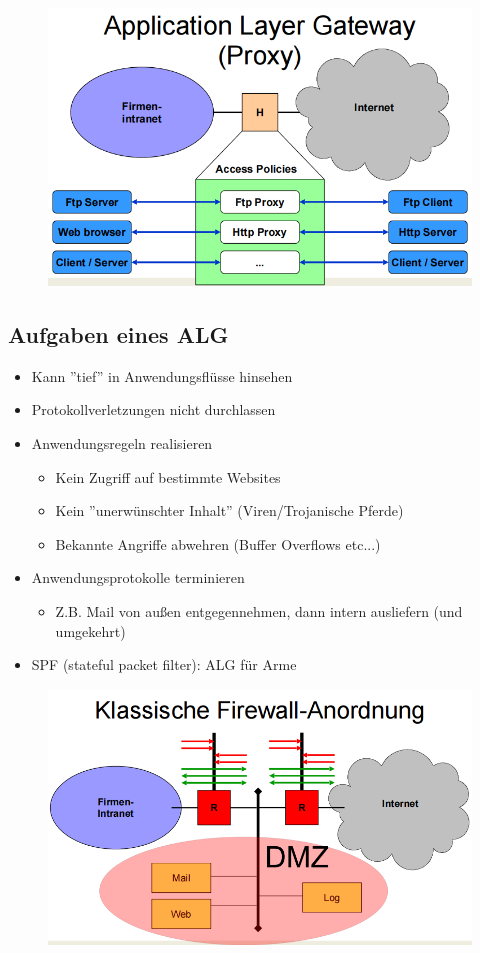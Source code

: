 \documentclass[openany]{book}
\begin{document}
\begin{figure}[h!]
    \centering
    \includegraphics[width=0.85\linewidth]{Pics/ApplicationLayerGateway.PNG}
\end{figure}

\subsection{Aufgaben eines ALG}

\begin{itemize}
    \item Kann ''tief'' in Anwendungsflüsse hinsehen
    \item Protokollverletzungen nicht durchlassen
    \item Anwendungsregeln realisieren
    \begin{itemize}
        \item Kein Zugriff auf bestimmte Websites
        \item Kein ''unerwünschter Inhalt'' (Viren/Trojanische Pferde)
        \item Bekannte Angriffe abwehren (Buffer Overflows etc...)
    \end{itemize}
    \item Anwendungsprotokolle terminieren
    \begin{itemize}
        \item Z.B. Mail von außen entgegennehmen, dann intern ausliefern (und umgekehrt)
    \end{itemize}
    \item SPF (stateful packet filter): ALG für Arme
\end{itemize}

\begin{figure}[h!]
    \centering
    \includegraphics[width=0.85\linewidth]{Pics/Firewall.PNG}
\end{figure}
\end{document}
